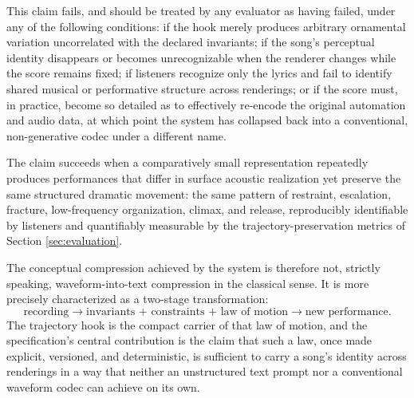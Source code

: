 \documentclass[11pt]{article}
\begin{document}
This claim fails, and should be treated by any evaluator as having failed, under any of the following conditions: if the hook merely produces arbitrary ornamental variation uncorrelated with the declared invariants; if the song's perceptual identity disappears or becomes unrecognizable when the renderer changes while the score remains fixed; if listeners recognize only the lyrics and fail to identify shared musical or performative structure across renderings; or if the score must, in practice, become so detailed as to effectively re-encode the original automation and audio data, at which point the system has collapsed back into a conventional, non-generative codec under a different name.

The claim succeeds when a comparatively small representation repeatedly produces performances that differ in surface acoustic realization yet preserve the same structured dramatic movement: the same pattern of restraint, escalation, fracture, low-frequency organization, climax, and release, reproducibly identifiable by listeners and quantifiably measurable by the trajectory-preservation metrics of Section \ref{sec:evaluation}.

The conceptual compression achieved by the system is therefore not, strictly speaking, waveform-into-text compression in the classical sense. It is more precisely characterized as a two-stage transformation:
\[
\text{recording}
\longrightarrow
\text{invariants + constraints + law of motion}
\longrightarrow
\text{new performance}.
\]
The trajectory hook is the compact carrier of that law of motion, and the specification's central contribution is the claim that such a law, once made explicit, versioned, and deterministic, is sufficient to carry a song's identity across renderings in a way that neither an unstructured text prompt nor a conventional waveform codec can achieve on its own.
\end{document}
